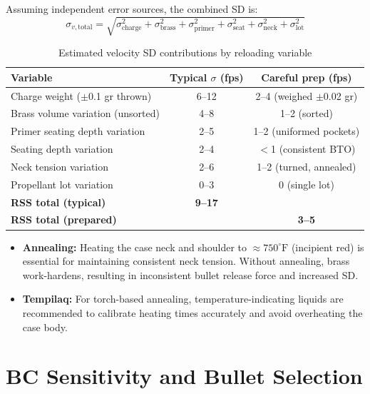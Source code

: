 \documentclass[11pt,twoside,openright]{report}
\begin{document}
Assuming independent error sources, the combined SD is:
\begin{equation}
  \sigma_{v,\text{total}} = \sqrt{\sigma_{\text{charge}}^2 + \sigma_{\text{brass}}^2 + \sigma_{\text{primer}}^2 + \sigma_{\text{seat}}^2 + \sigma_{\text{neck}}^2 + \sigma_{\text{lot}}^2}
  \label{eq:sd_budget}
\end{equation}

\begin{table}[H]
\centering
\caption{Estimated velocity SD contributions by reloading variable}
\label{tab:sd_contributions}
\begin{tabular}{@{}lcc@{}}
\toprule
\textbf{Variable} & \textbf{Typical $\sigma$ (fps)} & \textbf{Careful prep (fps)} \\
\midrule
Charge weight ($\pm$0.1 gr thrown) & 6--12 & 2--4 (weighed $\pm$0.02 gr) \\
Brass volume variation (unsorted) & 4--8 & 1--2 (sorted) \\
Primer seating depth variation & 2--5 & 1--2 (uniformed pockets) \\
Seating depth variation & 2--4 & $<$1 (consistent BTO) \\
Neck tension variation & 2--6 & 1--2 (turned, annealed) \\
Propellant lot variation & 0--3 & 0 (single lot) \\
\midrule
\textbf{RSS total (typical)} & \textbf{9--17} & \\
\textbf{RSS total (prepared)} & & \textbf{3--5} \\
\bottomrule
\end{tabular}
\end{table}

\begin{itemize}
    \item \textbf{Annealing:} Heating the case neck and shoulder to $\approx 750^\circ\mathrm{F}$ (incipient red) is essential for maintaining consistent neck tension. Without annealing, brass work-hardens, resulting in inconsistent bullet release force and increased SD.
    \item \textbf{Tempilaq:} For torch-based annealing, temperature-indicating liquids are recommended to calibrate heating times accurately and avoid overheating the case body.
\end{itemize}

\section{BC Sensitivity and Bullet Selection}
\end{document}
